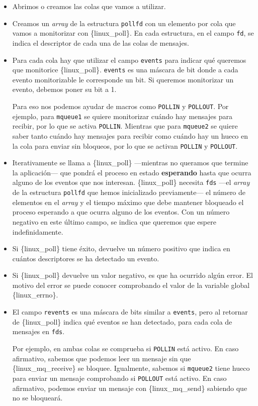 \begin{itemize}
\item
  Abrimos o creamos las colas que vamos a utilizar.
\item
  Creamos un \emph{array} de la estructura \texttt{pollfd} con un
  elemento por cola que vamos a monitorizar con \{linux\_poll\}. En cada
  estructura, en el campo \texttt{fd}, se indica el descriptor de cada
  una de las colas de mensajes.
\item
  Para cada cola hay que utilizar el campo \texttt{events} para indicar
  qué queremos que monitorice \{linux\_poll\}. \texttt{events} es una
  máscara de bit donde a cada evento monitorizable le corresponde un
  bit. Si queremos monitorizar un evento, debemos poner su bit a 1.

  Para eso nos podemos ayudar de macros como \texttt{POLLIN} y
  \texttt{POLLOUT}. Por ejemplo, para \texttt{mqueue1} se quiere
  monitorizar cuándo hay mensajes para recibir, por lo que se activa
  \texttt{POLLIN}. Mientras que para \texttt{mqueue2} se quiere saber
  tanto cuándo hay mensajes para recibir como cuándo hay un hueco en la
  cola para enviar sin bloqueos, por lo que se activan \texttt{POLLIN} y
  \texttt{POLLOUT}.
\item
  Iterativamente se llama a \{linux\_poll\} ---mientras no queramos que
  termine la aplicación--- que pondrá el proceso en estado
  \textbf{esperando} hasta que ocurra alguno de los eventos que nos
  interesan. \{linux\_poll\} necesita \texttt{fds} ---el \emph{array} de
  la estructura \texttt{pollfd} que hemos inicializado previamente--- el
  número de elementos en el \emph{array} y el tiempo máximo que debe
  mantener bloqueado el proceso esperando a que ocurra alguno de los
  eventos. Con un número negativo en este último campo, se indica que
  queremos que espere indefinidamente.
\item
  Si \{linux\_poll\} tiene éxito, devuelve un número positivo que indica
  en cuántos descriptores se ha detectado un evento.
\item
  Si \{linux\_poll\} devuelve un valor negativo, es que ha ocurrido
  algún error. El motivo del error se puede conocer comprobando el valor
  de la variable global \{linux\_errno\}.
\item
  El campo \texttt{revents} es una máscara de bits similar a
  \texttt{events}, pero al retornar de \{linux\_poll\} indica qué
  eventos se han detectado, para cada cola de mensajes en \texttt{fds}.

  Por ejemplo, en ambas colas se comprueba si \texttt{POLLIN} está
  activo. En caso afirmativo, sabemos que podemos leer un mensaje sin
  que \{linux\_mq\_receive\} se bloquee. Igualmente, sabemos si
  \texttt{mqueue2} tiene hueco para enviar un mensaje comprobando si
  \texttt{POLLOUT} está activo. En caso afirmativo, podemos enviar un
  mensaje con \{linux\_mq\_send\} sabiendo que no se bloqueará.
\end{itemize}

